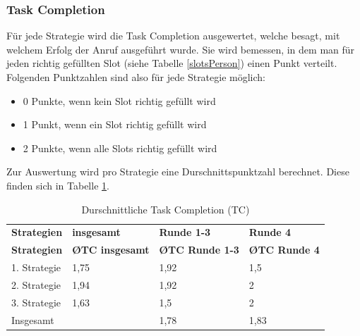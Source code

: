 \documentclass[12pt,a4paper]{scrartcl}
\begin{document}
\subsubsection{Task Completion}
Für jede Strategie wird die Task Completion ausgewertet, welche besagt, mit welchem Erfolg der Anruf ausgeführt wurde. Sie wird bemessen, in dem man für jeden richtig gefüllten Slot (siehe Tabelle \ref{slotsPerson}) einen Punkt verteilt. Folgenden Punktzahlen sind also für jede Strategie möglich:
\begin{itemize}
\item 0 Punkte, wenn kein Slot richtig gefüllt wird
\item 1 Punkt, wenn ein Slot richtig gefüllt wird
\item 2 Punkte, wenn alle Slots richtig gefüllt wird
\end{itemize}
Zur Auswertung wird pro Strategie eine Durschnittspunktzahl berechnet. 
Diese finden sich in Tabelle \ref{TCV1}.

\begin{longtable}{p{3cm}p{3cm}p{3cm}p{3cm} }
	\label{TCV1}\\
	\caption[Durschnittliche Task Completion (TC)]{Durschnittliche Task Completion (TC)}\\
	\hline
\textbf{Strategien}&\textbf{insgesamt}&\textbf{Runde 1-3} &\textbf{Runde 4}\\
	\hline
	\endfirsthead
	\hline
	\textbf{Strategien}&\textbf{\O TC insgesamt}&\textbf{\O TC Runde 1-3} &\textbf{\O TC Runde 4}\\
	\hline
	\endhead
1. Strategie & 1,75 & 1,92 & 1,5  \\
2. Strategie & 1,94 & 1,92 & 2  \\
3. Strategie & 1,63 & 1,5 & 2  \\
\hline
Insgesamt & & 1,78 & 1,83 \\ 
\hline
\end{longtable}
\end{document}
